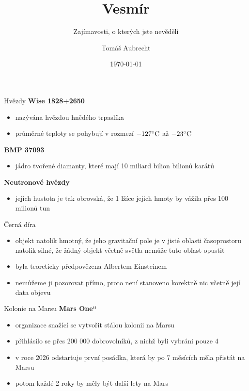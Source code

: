 \documentclass[pdf, slideColor]{beamer}
\providecommand{\uv}[1]{\quotedblbase #1\textquotedblleft}
\begin{document}
	\title{Vesmír}
	\subtitle{Zajímavosti, o kterých jste nevěděli}
	\author{Tomáš Aubrecht}
	\date{\today}
	\maketitle

\begin{frame}{Hvězdy}
\smallskip
\textbf{Wise 1828+2650}
	\begin{itemize}
		\item nazývána hvězdou hnědého trpaslíka
		\item průměrné teploty se pohybují v rozmezí $-127\celsius$ až $-23\celsius$ \smallskip
	\end{itemize}
\textbf{BMP 37093}
	\begin{itemize}
		\item jádro tvořené diamanty, které mají 10 miliard bilion bilionů karátů\smallskip
	\end{itemize}
\textbf{Neutronové hvězdy}	
	\begin{itemize}
		\item jejich hustota je tak obrovská, že 1 lžíce jejich hmoty by vážila přes 100 milionů tun\smallskip
\end{itemize}
\end{frame}

\begin{frame}{Černá díra}
\smallskip
\begin{itemize}
    \item objekt natolik hmotný, že jeho gravitační pole je v jisté oblasti časoprostoru natolik silné, že žádný objekt včetně světla nemůže tuto oblast opustit \smallskip
    \item byla teoreticky předpovězena Albertem Einsteinem \smallskip
    \item nemůžeme ji pozorovat přímo, proto není stanoveno korektně nic včetně její data objevu
\end{itemize}
\end{frame}

\begin{frame}{Kolonie na Marsu}
\smallskip
\textbf{\uv{Mars One}} \smallskip
\begin{itemize}
	\item organizace snažící se vytvořit stálou kolonii na Marsu
    \item přihlásilo se přes 200 000 dobrovolníků, z nichž byli vybráni pouze 4
    \item v roce 2026 odstartuje první posádka, která by po 7 měsících měla přistát na Marsu
	\item potom každé 2 roky by měly být další lety na Mars
\end{itemize}
\end{frame}
\end{document}
